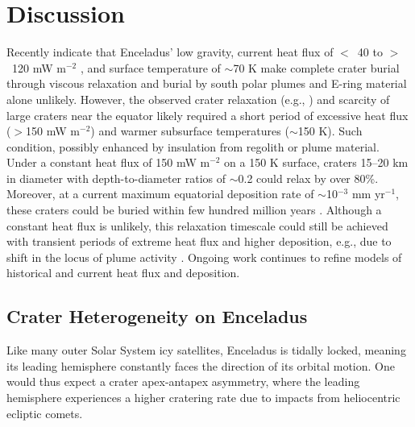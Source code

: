 \documentclass[preprint,12pt,3p,times,authoryear]{elsarticle}
\begin{document}
{%

\section{Discussion}

Recently \citet{Bland2012,Martin2023} indicate that Enceladus’ low gravity, current heat flux of $<$~40 to $>$~120 mW m$^{-2}$ \citep{Cadek2019,Kinczyk2024}, and surface temperature of $\sim$70 K make complete crater burial through viscous relaxation and burial by south polar plumes and E-ring material alone unlikely. However, the observed crater relaxation (e.g., \citealt{Bland2012}) and scarcity of large craters near the equator likely required a short period of excessive heat flux ($>$150 mW m$^{-2}$) and warmer subsurface temperatures ($\sim$150 K). Such condition, possibly enhanced by insulation from regolith or plume material. Under a constant heat flux of 150 mW m$^{-2}$ on a 150 K surface, craters 15–20 km in diameter with depth-to-diameter ratios of $\sim$0.2 could relax by over 80\%. Moreover, at a current maximum equatorial deposition rate of $\sim$10$^{-3}$ mm yr$^{-1}$, these craters could be buried within few hundred million years \citep{Bland2012}. Although a constant heat flux is unlikely, this relaxation timescale could still be achieved with transient periods of extreme heat flux and higher deposition, e.g., due to shift in the locus of plume activity \citep{Bland2012}. Ongoing work continues to refine models of historical and current heat flux and deposition.


\subsection{Crater Heterogeneity on Enceladus}
\label{sub:hetero}
Like many outer Solar System icy satellites, Enceladus is tidally locked, meaning its leading hemisphere constantly faces the direction of its orbital motion. One would thus expect a crater apex-antapex asymmetry, where the leading hemisphere experiences a higher cratering rate due to impacts from heliocentric ecliptic comets.\\

}
\end{document}
